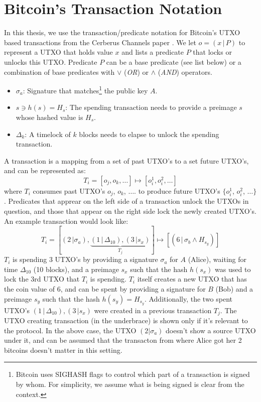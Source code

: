 \section{Bitcoin's Transaction Notation}
In this thesis, we use the transaction/predicate notation for Bitcoin's UTXO based transactions from the Cerberus Channels paper \cite{cerberus}. We let $o = (x\,|\,P)$ to represent a UTXO that holds value $x$ and lists a predicate $P$ that locks or unlocks this UTXO. Predicate $P$ can be a base predicate (see list below) or a combination of base predicates with $\lor$ (\textit{OR}) or $\land$ (\textit{AND}) operators.
\begin{itemize}
    \item $\sigma_a$: Signature that matches\footnote{Bitcoin uses SIGHASH flags to control which part of a transaction is signed by whom. For simplicity, we assume what is being signed is clear from the context.} the public key $A$.
    \item $s \ni h(s) = H_s$: The spending transaction needs to provide a preimage $s$ whose hashed value is $H_s$.
    \item $\Delta_k$: A timelock of $k$ blocks needs to elapse to unlock the spending transaction.
\end{itemize}
A transaction is a mapping from a set of past UTXO's to a set future UTXO's, and can be represented as:
$$T_i = [o_j, o_k, \ldots] \mapsto [o_i^1, o_i^2, \ldots]$$
where $T_i$ consumes past UTXO's $o_j$, $o_k$, $\ldots$. to produce future UTXO's $\{o_i^1$, $o_i^2$, $\ldots\}$. Predicates that apprear on the left side of a transaction unlock the UTXOs in question, and those that appear on the right side lock the newly created UTXO's. An example transaction would look like:
$$T_i = [(2\,|\sigma_a), \underbrace{(1\,|\,\Delta_{10}), (3\,|s_x)}_{T_j}] \mapsto [(6\,|\,\sigma_b \land H_{s_y})]$$
$T_i$ is spending 3 UTXO's by providing a signature $\sigma_a$ for $A$ (Alice), waiting for time $\Delta_{10}$ (10 blocks), and a preimage $s_x$ such that the hash $h(s_x)$ was used to lock the 3rd UTXO that $T_i$ is spending. $T_i$ itself creates a new UTXO that has the coin value of 6, and can be spent by providing a signature for $B$ (Bob) and a preimage $s_y$ such that the hash $h(s_y) = H_{s_y}$. Additionally, the two spent UTXO's $(1\,|\,\Delta_{10}), (3\,|s_x)$ were created in a previous transaction $T_j$. The UTXO creating transaction (in the underbrace) is shown only if it's relevant to the protocol. In the above case, the UTXO $(2|\sigma_a)$ doesn't show a source UTXO under it, and can be assumed that the transacton from where Alice got her 2 bitcoins doesn't matter in this setting. 

